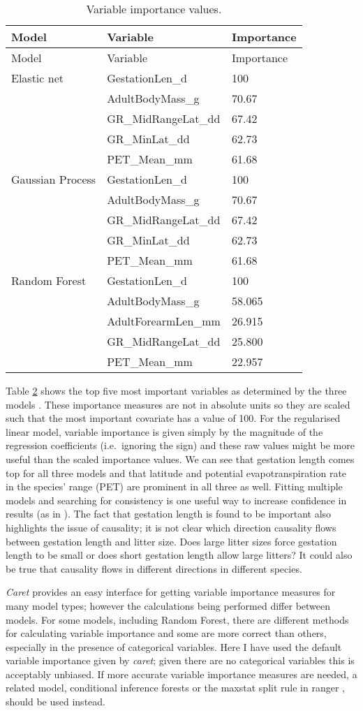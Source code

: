 \documentclass[12pt,]{article}
\begin{document}
\begin{table}[t!]
\begin{longtable}[c]{@{}lll@{}}
\caption{Variable importance values. \label{tbl:varimp}}\tabularnewline
\toprule
Model & Variable & Importance\tabularnewline
\midrule
\endfirsthead
\toprule
Model & Variable & Importance\tabularnewline
\midrule
\endhead
Elastic net & GestationLen\_d & 100\tabularnewline
& AdultBodyMass\_g & 70.67\tabularnewline
& GR\_MidRangeLat\_dd & 67.42\tabularnewline
& GR\_MinLat\_dd & 62.73\tabularnewline
& PET\_Mean\_mm & 61.68\tabularnewline
Gaussian Process & GestationLen\_d & 100\tabularnewline
& AdultBodyMass\_g & 70.67\tabularnewline
& GR\_MidRangeLat\_dd & 67.42\tabularnewline
& GR\_MinLat\_dd & 62.73\tabularnewline
& PET\_Mean\_mm & 61.68\tabularnewline
Random Forest & GestationLen\_d & 100\tabularnewline
& AdultBodyMass\_g & 58.065\tabularnewline
& AdultForearmLen\_mm & 26.915\tabularnewline
& GR\_MidRangeLat\_dd & 25.800\tabularnewline
& PET\_Mean\_mm & 22.957\tabularnewline
\bottomrule
\end{longtable}
\end{table}

Table \ref{tbl:varimp} shows the top five most important variables as determined by the three models \citep{oppel2009alternative}.
These importance measures are not in absolute units so they are scaled such that the most important covariate has a value of 100.
For the regularised linear model, variable importance is given simply by the magnitude of the regression coefficients (i.e.~ignoring the sign) and these raw values might be more useful than the scaled importance values.
We can see that gestation length comes top for all three models and that latitude and potential evapotranspiration rate in the species' range (PET) are prominent in all three as well.
Fitting multiple models and searching for consistency is one useful way to increase confidence in results (as in \citet{appelhans2015evaluating}).
The fact that gestation length is found to be important also highlights the issue of causality; it is not clear which direction causality flows between gestation length and litter size.
Does large litter sizes force gestation length to be small or does short gestation length allow large litters? 
It could also be true that causality flows in different directions in different species.

\emph{Caret} provides an easy interface for getting variable importance measures for many model types; however the calculations being performed differ between models.
For some models, including Random Forest, there are different methods for calculating variable importance \citep{oppel2009alternative, seifert2019surrogate, basu2018iterative, wright2016little} and some are more correct than others, especially in the presence of categorical variables.
Here I have used the default variable importance given by \emph{caret}; given there are no categorical variables this is acceptably unbiased.
If more accurate variable importance measures are needed, a related model, conditional inference forests \citep{hothorn2006unbiased} or the maxstat split rule in ranger \citep{wright2017unbiased}, should be used instead.
\end{document}
